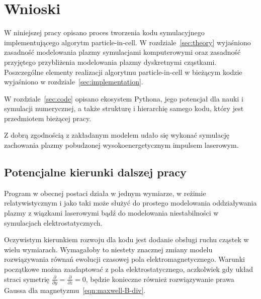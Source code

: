 \section[Wnioski]{Wnioski}\label{sec:ending} %

W niniejszej pracy opisano proces tworzenia kodu symulacyjnego implementującego
algorytm particle-in-cell. W rozdziale~\ref{sec:theory} wyjaśniono zasadność modelowania plazmy symulacjami komputerowymi oraz zasadność przyjętego przybliżenia
modelowania plazmy dyskretnymi cząstkami. Poszczególne elementy realizacji algorytmu particle-in-cell w bieżącym kodzie wyjaśniono w rozdziale~\ref{sec:implementation}.

W rozdziale~\ref{sec:code} opisano ekosystem Pythona, jego potencjał dla nauki i symulacji numerycznej, a także strukturę i hierarchię samego kodu, który jest przedmiotem bieżącej pracy.

Z dobrą zgodnością z zakładanym modelem udało się wykonać symulację zachowania plazmy pobudzonej wysokoenergetycznym impulsem laserowym. %


\subsection{Potencjalne kierunki dalszej pracy}

Program w obecnej postaci działa w jednym wymiarze, w reżimie relatywistycznym i jako taki może służyć do prostego modelowania oddziaływania plazmy z wiązkami laserowymi
bądź do modelowania niestabilności w symulacjach elektrostatycznych.

Oczywistym kierunkiem rozwoju dla kodu jest dodanie obsługi ruchu cząstek w wielu wymiarach. Wymagałoby to niestety znacznej zmiany modelu rozwiązywania równań ewolucji czasowej pola elektromagnetycznego.
Warunki początkowe można zaadaptować z pola elektrostatycznego, aczkolwiek gdy układ straci symetrię $\frac{\partial}{\partial y} = \frac{\partial}{\partial z} = 0$, będzie konieczne również rozwiązywanie
prawa Gaussa dla magnetyzmu~\ref{eqn:maxwell-B-div}.

